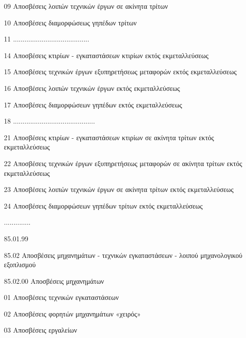 \documentclass[A4,10pt,greek]{book}
\begin{document}
                               09    Αποσβέσεις λοιπών τεχνικών έργων σε ακίνητα τρίτων

                               10    Αποσβέσεις διαμορφώσεως γηπέδων τρίτων

                               11    ........................................

                               14    Αποσβέσεις κτιρίων - εγκαταστάσεων κτιρίων εκτός
                                       εκμεταλλεύσεως

                               15    Αποσβέσεις τεχνικών έργων εξυπηρετήσεως μεταφορών εκτός
                                       εκμεταλλεύσεως

                               16    Αποσβέσεις λοιπών τεχνικών έργων εκτός εκμεταλλεύσεως

                               17    Αποσβέσεις διαμορφώσεων γηπέδων εκτός εκμεταλλεύσεως

                               18    ...........................................

                               21    Αποσβέσεις κτιρίων - εγκαταστάσεων κτιρίων σε ακίνητα
                                       τρίτων εκτός εκμεταλλεύσεως

                               22    Αποσβέσεις τεχνικών έργων εξυπηρετήσεως μεταφορών σε
                                       ακίνητα τρίτων εκτός εκμεταλλεύσεως

                               23    Αποσβέσεις λοιπών τεχνικών έργων σε ακίνητα τρίτων εκτός
                                       εκμεταλλεύσεως

                               24    Αποσβέσεις διαμορφώσεων γηπέδων τρίτων εκτός
                                       εκμεταλλεύσεως

                    ..............

                    85.01.99

        85.02    Αποσβέσεις μηχανημάτων - τεχνικών εγκαταστάσεων - λοιπού
                     μηχανολογικού εξοπλισμού

                    85.02.00    Αποσβέσεις μηχανημάτων

                               01    Αποσβέσεις τεχνικών εγκαταστάσεων

                               02    Αποσβέσεις φορητών μηχανημάτων «χειρός»

                               03    Αποσβέσεις εργαλείων
\end{document}
